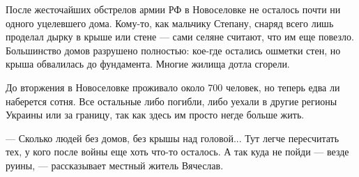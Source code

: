 После жесточайших обстрелов армии РФ в Новоселовке не осталось почти ни одного
уцелевшего дома. Кому-то, как мальчику Степану, снаряд всего лишь проделал
дырку в крыше или стене — сами селяне считают, что им еще повезло. Большинство
домов разрушено полностью: кое-где остались ошметки стен, но крыша обвалилась
до фундамента. Многие жилища дотла сгорели. 

До вторжения в Новоселовке проживало около 700 человек, но теперь едва ли
наберется сотня. Все остальные либо погибли, либо уехали в другие регионы
Украины или за границу, так как здесь им просто негде больше жить. 

— Сколько людей без домов, без крышы над головой... Тут легче пересчитать тех, у
кого после войны еще хоть что-то осталось. А так куда не пойди — везде руины, —
рассказывает местный житель Вячеслав.

